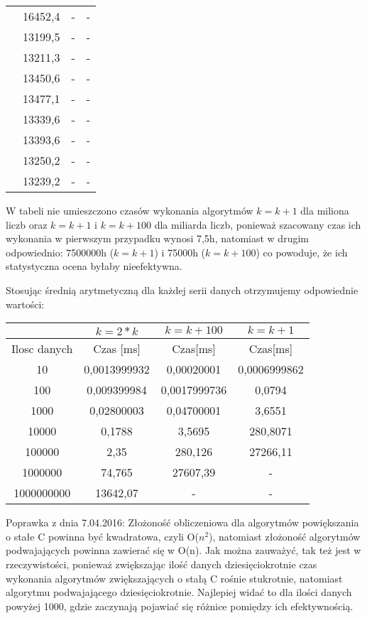 \documentclass[10pt, a4paper]{article}
\begin{document}
\begin{flushleft}
\begin{table}[h]
\begin{tabular}{|c|c|c|c|}
 & 16452,4 & - & - \\
 & 13199,5 & - & - \\
 & 13211,3 & - & - \\
 & 13450,6 & - & - \\
 & 13477,1 & - & - \\
 & 13339,6 & - & - \\
 & 13393,6 & - & - \\
 & 13250,2 & - & - \\
 & 13239,2 & - & - \\ \hline
\end{tabular}
\end{table}

W tabeli nie umieszczono czasów wykonania algorytmów $k=k+1$ dla miliona liczb oraz $k=k+1$ i $k=k+100$ dla miliarda liczb, ponieważ szacowany czas ich wykonania w pierwszym przypadku wynosi 7,5h, natomiast w drugim odpowiednio: 7500000h ($k=k+1$) i 75000h ($k=k+100$) co powoduje, że ich statystyczna ocena byłaby nieefektywna.

\newpage

Stosując średnią arytmetyczną dla każdej serii danych otrzymujemy odpowiednie wartości:
\begin{table}[h]
\centering
\begin{tabular}{|c|c|c|c|} \hline
 & $k=2*k$ & $k=k+100$ & $k=k+1$ \\ \hline
Ilosc danych & Czas [ms] & Czas[ms] & Czas[ms] \\ \hline
10 & 0,0013999932 & 0,00020001 & 0,0006999862 \\ \hline
100 & 0,009399984 & 0,0017999736 & 0,0794 \\ \hline
1000 & 0,02800003 & 0,04700001 & 3,6551 \\ \hline
10000 & 0,1788 & 3,5695 & 280,8071 \\ \hline
100000 & 2,35 & 280,126 & 27266,11 \\ \hline
1000000 & 74,765 & 27607,39 & - \\ \hline
1000000000 & 13642,07 & - & - \\ \hline
\end{tabular}
\end{table} \newline

Poprawka z dnia 7.04.2016: \newline
Złożoność obliczeniowa dla algorytmów powiększania o stałe C powinna być kwadratowa, czyli O($n^2$), natomiast złożoność algorytmów podwajających powinna zawierać się w O(n). Jak można zauważyć, tak też jest w rzeczywistości, ponieważ zwiększając ilość danych dziesięciokrotnie czas wykonania algorytmów zwiększających o stałą C rośnie stukrotnie, natomiast algorytmu podwajającego dziesięciokrotnie. Najlepiej widać to dla ilości danych powyżej 1000, gdzie zaczynają pojawiać się różnice pomiędzy ich efektywnością. \newline \newline


\end{flushleft}
\end{document}
